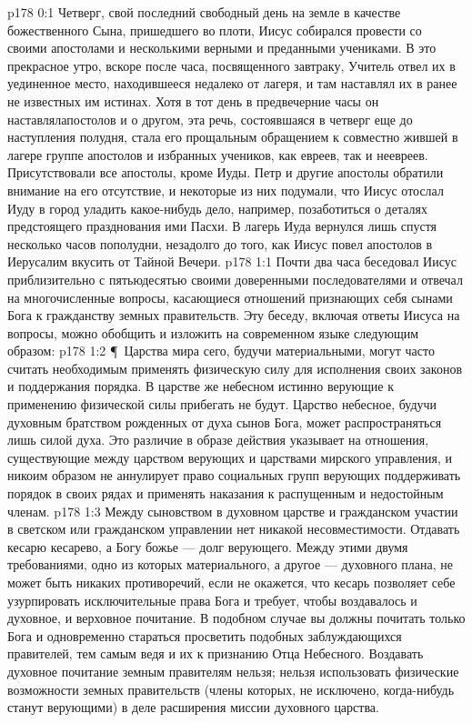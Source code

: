 \vs p178 0:1 Четверг, свой последний свободный день на земле в качестве божественного Сына, пришедшего во плоти, Иисус собирался провести со своими апостолами и несколькими верными и преданными учениками. В это прекрасное утро, вскоре после часа, посвященного завтраку, Учитель отвел их в уединенное место, находившееся недалеко от лагеря, и там наставлял их в ранее не известных им истинах. Хотя в тот день в предвечерние часы он наставлялапостолов и о другом, эта речь, состоявшаяся в четверг еще до наступления полудня, стала его прощальным обращением к совместно жившей в лагере группе апостолов и избранных учеников, как евреев, так и неевреев. Присутствовали все апостолы, кроме Иуды. Петр и другие апостолы обратили внимание на его отсутствие, и некоторые из них подумали, что Иисус отослал Иуду в город уладить какое\hyp{}нибудь дело, например, позаботиться о деталях предстоящего празднования ими Пасхи. В лагерь Иуда вернулся лишь спустя несколько часов пополудни, незадолго до того, как Иисус повел апостолов в Иерусалим вкусить от Тайной Вечери.
\vs p178 1:1 Почти два часа беседовал Иисус приблизительно с пятьюдесятью своими доверенными последователями и отвечал на многочисленные вопросы, касающиеся отношений признающих себя сынами Бога к гражданству земных правительств. Эту беседу, включая ответы Иисуса на вопросы, можно обобщить и изложить на современном языке следующим образом:
\vs p178 1:2 \P\ Царства мира сего, будучи материальными, могут часто считать необходимым применять физическую силу для исполнения своих законов и поддержания порядка. В царстве же небесном истинно верующие к применению физической силы прибегать не будут. Царство небесное, будучи духовным братством рожденных от духа сынов Бога, может распространяться лишь силой духа. Это различие в образе действия указывает на отношения, существующие между царством верующих и царствами мирского управления, и никоим образом не аннулирует право социальных групп верующих поддерживать порядок в своих рядах и применять наказания к распущенным и недостойным членам.
\vs p178 1:3 Между сыновством в духовном царстве и гражданском участии в светском или гражданском управлении нет никакой несовместимости. Отдавать кесарю кесарево, а Богу божье --- долг верующего. Между этими двумя требованиями, одно из которых материального, а другое --- духовного плана, не может быть никаких противоречий, если не окажется, что кесарь позволяет себе узурпировать исключительные права Бога и требует, чтобы воздавалось и духовное, и верховное почитание. В подобном случае вы должны почитать только Бога и одновременно стараться просветить подобных заблуждающихся правителей, тем самым ведя и их к признанию Отца Небесного. Воздавать духовное почитание земным правителям нельзя; нельзя использовать физические возможности земных правительств (члены которых, не исключено, когда\hyp{}нибудь станут верующими) в деле расширения миссии духовного царства.
